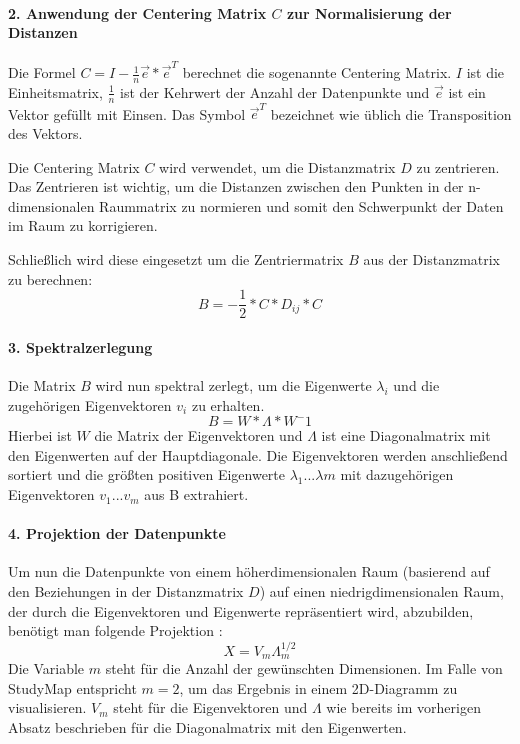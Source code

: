 \paragraph*{2. Anwendung der Centering Matrix $ C $ zur Normalisierung der
Distanzen}
Die Formel $ C = I - \frac{1}{n} \vec{e} * \vec{e}^T $ berechnet die
sogenannte Centering Matrix. $ I $ ist die Einheitsmatrix, $ \frac{1}{n} $ ist
der Kehrwert der Anzahl der Datenpunkte und $ \vec{e} $ ist ein Vektor gefüllt
mit Einsen. Das Symbol $ \vec{e}^T $ bezeichnet wie üblich die Transposition
des Vektors. \parencite{an-introduction-to-mds}

Die Centering Matrix $ C $ wird verwendet, um die Distanzmatrix $ D $ zu
zentrieren. Das Zentrieren ist wichtig, um die Distanzen zwischen den Punkten
in der n-dimensionalen Raummatrix zu normieren und somit den Schwerpunkt der
Daten im Raum zu korrigieren. \parencite{an-introduction-to-mds}

Schließlich wird diese eingesetzt um die Zentriermatrix $ B $ aus der
Distanzmatrix zu berechnen:
$$ B = - \frac{1}{2} * C * D_{ij} * C $$

\paragraph*{3. Spektralzerlegung}
Die Matrix $ B $ wird nun spektral zerlegt, um die Eigenwerte $ \lambda_{i} $
und die zugehörigen Eigenvektoren $ v_{i} $ zu erhalten.
$$ B = W * \Lambda * W^-1 $$
Hierbei ist $ W $ die Matrix der Eigenvektoren und $ \Lambda $ ist eine
Diagonalmatrix mit den Eigenwerten auf der Hauptdiagonale. Die Eigenvektoren
werden anschließend sortiert und die größten positiven Eigenwerte
$ \lambda_{1} ... \lambda{m} $ mit dazugehörigen Eigenvektoren
$ v_{1} ... v_{m} $ aus B extrahiert. \parencite{an-introduction-to-mds}

\paragraph*{4. Projektion der Datenpunkte}
Um nun die Datenpunkte von einem höherdimensionalen Raum (basierend auf den
Beziehungen in der Distanzmatrix $ D $) auf einen niedrigdimensionalen Raum,
der durch die Eigenvektoren und Eigenwerte repräsentiert wird, abzubilden,
benötigt man folgende Projektion \parencite{intro-to-multidimensional-scaling}:
$$ X = V_m \Lambda^{1/2}_m $$
Die Variable $ m $ steht für die Anzahl der gewünschten Dimensionen. Im Falle
von StudyMap entspricht $ m = 2 $, um das Ergebnis in einem 2D-Diagramm zu
visualisieren. $ V_{m} $ steht für die Eigenvektoren und $ \Lambda $ wie bereits
im vorherigen Absatz beschrieben für die Diagonalmatrix mit den Eigenwerten.
\parencite{an-introduction-to-mds}

